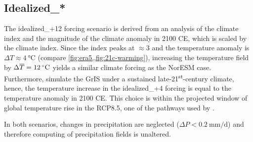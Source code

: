 \subsection{Idealized\_*}\label{app:forcing-idealized}

The idealized\_+12 forcing scenario is derived from an analysis of the climate index and the magnitude of the climate anomaly in 2100 CE, which is scaled by the climate index. Since the index peaks at \(\approx\num{3}\) and the temperature anomaly is \(\Delta T\approx\SI{4}{\celsius}\) (compare \cref{fig:era5,,fig:21c-warming}), increasing the temperature field by \(\Delta\overline{T}=\SI{12}{\celsius}\) yields a similar climate forcing as the NorESM case. Furthermore, \Textcite{greve2022} simulate the GrIS under a sustained late-21\textsuperscript{st}-century climate, hence, the temperature increase in the idealized\_+4 forcing is equal to the temperature anomaly in 2100 CE. This choice is within the projected window of global temperature rise in the RCP8.5, one of the pathways used by \textcite{greve2022}.

In both scenarios, changes in precipitation are neglected (\(\Delta P < \SI{0.2}{\mm\per\day}\)) and therefore computing of precipitation fields is unaltered.

